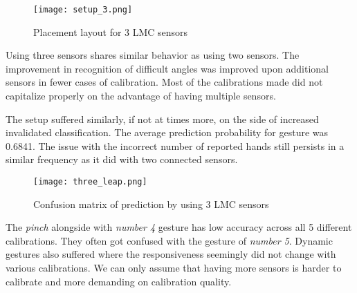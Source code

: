 \begin{figure}[ht]
    \centering
    \texttt{[image: setup\_3.png]}
    \caption{Placement layout for 3 LMC sensors}
    \label{fig:setup_3}
\end{figure}


Using three sensors shares similar behavior as using two sensors. The improvement in recognition of difficult angles was improved upon additional sensors in fewer cases of calibration. Most of the calibrations made did not capitalize properly on the advantage of having multiple sensors. 

The setup suffered similarly, if not at times more, on the side of increased invalidated classification. The average prediction probability for gesture was 0.6841. The issue with the incorrect number of reported hands still persists in a similar frequency as it did with two connected sensors.

\begin{figure}[ht]
    \centering
    \texttt{[image: three\_leap.png]}
    \caption{Confusion matrix of prediction by using 3 LMC sensors}
    \label{fig:confuse_3}
\end{figure}

The \textit{pinch} alongside with \textit{number 4} gesture has low accuracy across all 5 different calibrations. They often got confused with the gesture of \textit{number 5}. Dynamic gestures also suffered where the responsiveness seemingly did not change with various calibrations. We can only assume that having more sensors is harder to calibrate and more demanding on calibration quality.



